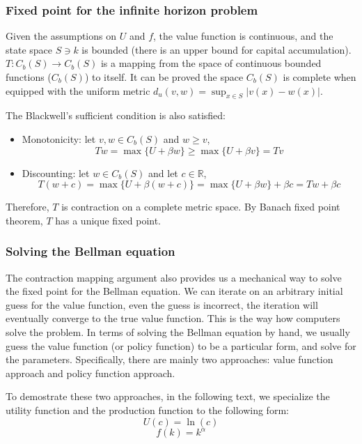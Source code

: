 \documentclass[10pt,a4]{article}
\begin{document}
\subsubsection{Fixed point for the infinite horizon
problem}

{\label{142845}}

Given the assumptions on $U$ and $f$, the value function is continuous, and the state space $S \ni k$ is  bounded (there is an upper bound for capital accumulation). $T: C_b(S) \to C_b(S)$ is a mapping from the space of continuous bounded functions ($C_b(S)$) to itself. It can be proved the space $C_b(S)$ is complete when equipped with the uniform metric $d_u(v,w) = \sup_{x\in S}|v(x) - w(x)|$. 

The Blackwell's sufficient condition is also satisfied:
\begin{itemize}
\item Monotonicity: let $v,w \in C_b(S)$ and $w \ge v$, 
      $$ Tw = \max\{U + \beta w\} \ge \max\{U + \beta v\} = Tv $$
\item Discounting: let $w \in C_b(S)$ and let $c \in \mathbb{R}$, 
      $$ T(w+c) = \max\{U + \beta(w+c)\} = \max\{U + \beta w\} + \beta c = Tw + \beta c $$
\end{itemize}

Therefore, $T$ is contraction on a complete metric space. By Banach fixed point theorem, $T$ has a unique fixed point. 

\subsubsection{Solving the Bellman
equation}

{\label{838588}}

The contraction mapping argument also provides us a mechanical way to
solve the fixed point for the Bellman equation. We can iterate on an
arbitrary initial guess for the value function, even the guess is
incorrect, the iteration will eventually converge to the true value
function. This is the way how computers solve the problem. In terms of
solving the Bellman equation by hand, we usually guess the value
function (or policy function) to be a particular form, and solve for the
parameters. Specifically, there are mainly two approaches: value
function approach and policy function approach.

\par\null

To demostrate these two approaches, in the following text, we specialize the utility function and the production function to the following form:
$$ U(c) = \ln (c) $$
$$ f(k) = k^{\alpha} $$
\end{document}
